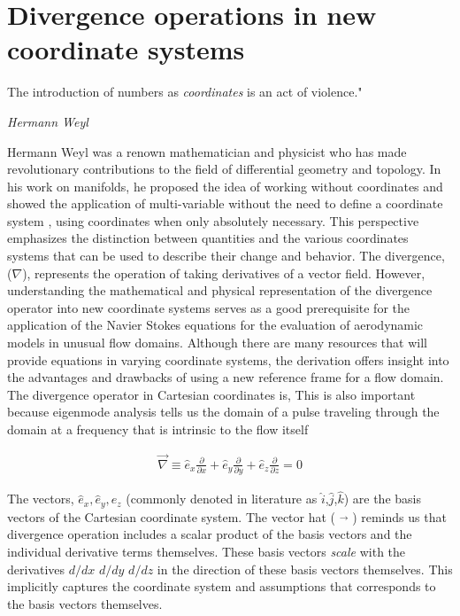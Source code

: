 

\section{Divergence operations in new coordinate systems}

\epigraph{The introduction of numbers as \textit{coordinates} is an act of violence."} {\textit{Hermann Weyl}}

Hermann Weyl was a renown mathematician and physicist who has made revolutionary contributions to the field of differential geometry and topology. In his work on manifolds, he proposed the idea of working without coordinates and showed the application of multi-variable without the need to define a coordinate system , using coordinates when only absolutely necessary. This perspective emphasizes the distinction between quantities and the various coordinates systems that can be used to describe their change and behavior.
The divergence, ($\nabla$), represents the operation of taking derivatives of a vector field. However, understanding the mathematical and physical representation of the divergence operator into new coordinate systems serves as a good prerequisite for the application of the Navier Stokes equations for the evaluation of aerodynamic models in unusual flow domains. Although there are many resources that will provide equations in varying coordinate systems, the derivation offers insight into the advantages and drawbacks of using a new reference frame for a flow domain. The divergence operator in Cartesian coordinates is,
This is also important because eigenmode analysis tells us the domain of a pulse traveling through the domain at a frequency that is intrinsic to the flow itself



\begin{align*}
\vec{\nabla} \equiv
\hat{e}_x \frac{\partial }{\partial x}  %
+ \hat{e}_y \frac{\partial }{\partial y}  %
	+ \hat{e}_z \frac{\partial }{\partial z}                      = 0
\label{Divergence_Operator}
\end{align*}

The vectors, $\hat{e}_x,\hat{e}_y,\hat{e}_z$ (commonly denoted in literature as $\hat{i}$,$\hat{j}$,$\hat{k}$) are the basis vectors of the Cartesian coordinate system. The vector hat ( $\vec{}$ ) reminds us that divergence operation includes a scalar product of  the basis vectors and the individual derivative terms themselves.
These basis vectors \textit{scale} with the derivatives $d/dx$ $d/dy$ $d/dz$ in the direction of these basis vectors themselves. This implicitly captures the coordinate system and assumptions that corresponds to the basis vectors themselves.

